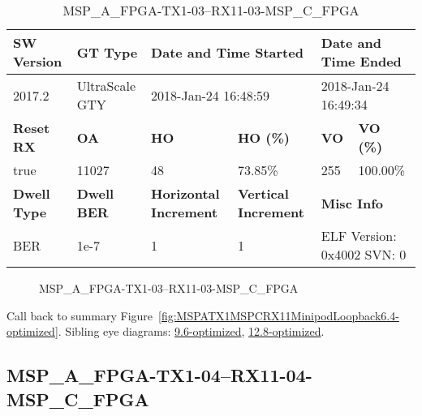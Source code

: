 \begin{table}[h]
\centering
\caption{MSP\_A\_FPGA-TX1-03--RX11-03-MSP\_C\_FPGA}
\label{tab:MSPAFPGATX103RX1103MSPCFPGA6.4-optimized}
\begin{tabular}{@{}|l|l|l|l|l|l|@{}}
\toprule
\textbf{SW Version}                & \textbf{GT Type}   & \multicolumn{2}{l|}{\textbf{Date and Time Started}}            & \multicolumn{2}{l|}{\textbf{Date and Time Ended}}        \\ \midrule
2017.2                       & UltraScale GTY          & \multicolumn{2}{l|}{2018-Jan-24 16:48:59}                   & \multicolumn{2}{l|}{2018-Jan-24 16:49:34}               \\ \midrule
\textbf{Reset RX}                  & \textbf{OA} & \textbf{HO}   & \textbf{HO (\%)} & \textbf{VO} & \textbf{VO (\%)} \\ \midrule
true & 11027        & 48          & 73.85\%        & 255        & 100.00\%       \\ \midrule
\textbf{Dwell Type}                & \textbf{Dwell BER} & \textbf{Horizontal Increment} & \textbf{Vertical Increment}    & \multicolumn{2}{l|}{\textbf{Misc Info}}                  \\ \midrule
BER                            & 1e-7        & 1        & 1           & \multicolumn{2}{l|}{ELF Version: 0x4002 SVN: 0}                         \\ \bottomrule
\end{tabular}
\end{table}

\begin{figure}[h]
\caption{MSP\_A\_FPGA-TX1-03--RX11-03-MSP\_C\_FPGA} \label{fig:MSPAFPGATX103RX1103MSPCFPGA6.4-optimized}
\end{figure}

Call back to summary Figure~\ref{fig:MSPATX1MSPCRX11MinipodLoopback6.4-optimized}.
Sibling eye diagrams: \hyperref[sec:MSPAFPGATX103RX1103MSPCFPGA9.6-optimized]{9.6-optimized}, \hyperref[sec:MSPAFPGATX103RX1103MSPCFPGA12.8-optimized]{12.8-optimized}.

\clearpage
\newpage


\subsection{MSP\_A\_FPGA-TX1-04--RX11-04-MSP\_C\_FPGA}\label{sec:MSPAFPGATX104RX1104MSPCFPGA6.4-optimized}

